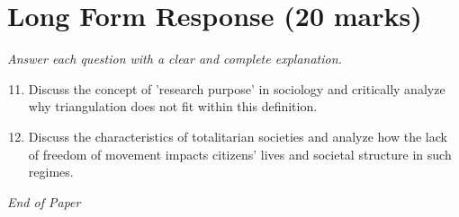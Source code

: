\documentclass[12pt]{article}
\begin{document}
\section*{Long Form Response (20 marks)}
\textit{Answer each question with a clear and complete explanation.}
\begin{enumerate}[label=\arabic*.]
\setcounter{enumi}{10}
\item Discuss the concept of 'research purpose' in sociology and critically analyze why triangulation does not fit within this definition.
\item Discuss the characteristics of totalitarian societies and analyze how the lack of freedom of movement impacts citizens' lives and societal structure in such regimes.
\end{enumerate}

\vfill
\noindent\textit{End of Paper}
\end{document}
